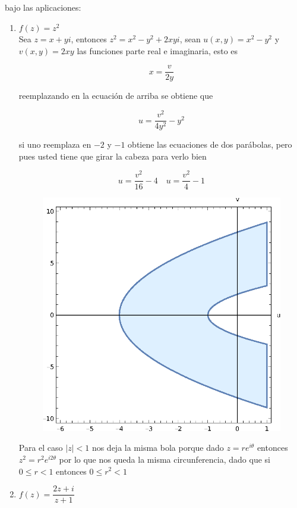 \documentclass[11pt]{article}
\begin{document}
\begin{enumerate}
    bajo las aplicaciones:
    \begin{enumerate}
        \item \( f(z) = z^2 \)\\

        Sea $z=x+yi$, entonces $z^2=x^2-y^2+2xyi$, sean $u(x,y)=x^2-y^2$ y $v(x,y)=2xy$ las funciones parte real e imaginaria, esto es

        $$x=\frac{v}{2y}$$ 

        reemplazando en la ecuación de arriba se obtiene que 

        $$u=\frac{v^2}{4y^2}-y^2$$

        si uno reemplaza en $-2$ y $-1$ obtiene las ecuaciones de dos parábolas, pero pues usted tiene que girar la cabeza  para verlo bien

        $$u=\frac{v^2}{16}-4\quad u=\frac{v^2}{4}-1$$

       \begin{figure}[H]
        \centering
        \includegraphics[scale=0.86]{S1.eps}
        \end{figure}     

        Para el caso $|z|<1$ nos deja la misma bola porque dado $z=re^{i\theta}$ entonces $z^2=r^2e^{i2\theta}$ por lo que nos queda la misma circunferencia, dado que si $0\leq r<1$ entonces $0\leq r^2<1$
        \item \( f(z) = \dfrac{2z + i}{z + 1} \)\\


\end{enumerate}
\end{enumerate}
\end{document}
